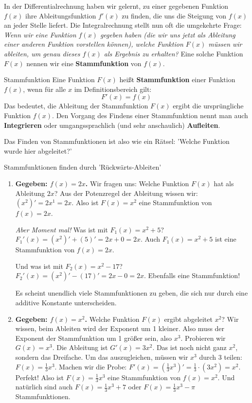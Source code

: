 In der Differentialrechnung haben wir gelernt, zu einer gegebenen Funktion $f(x)$ ihre Ableitungsfunktion $f'(x)$ zu finden, die uns die Steigung von $f(x)$ an jeder Stelle liefert.
Die Integralrechnung stellt nun oft die umgekehrte Frage:
\textit{Wenn wir eine Funktion $f(x)$ gegeben haben (die wir uns jetzt als Ableitung einer anderen Funktion vorstellen können), welche Funktion $F(x)$ müssen wir ableiten, um genau dieses $f(x)$ als Ergebnis zu erhalten?}
Eine solche Funktion $F(x)$ nennen wir eine \textbf{Stammfunktion} von $f(x)$.

\begin{merksatzumgebung}{Stammfunktion}
Eine Funktion $F(x)$ heißt \textbf{Stammfunktion} einer Funktion $f(x)$, wenn für alle $x$ im Definitionsbereich gilt:
\[ F'(x) = f(x) \]
Das bedeutet, die Ableitung der Stammfunktion $F(x)$ ergibt die ursprüngliche Funktion $f(x)$.
Den Vorgang des Findens einer Stammfunktion nennt man auch \textbf{Integrieren} oder umgangssprachlich (und sehr anschaulich) \textbf{Aufleiten}.
\end{merksatzumgebung}

Das Finden von Stammfunktionen ist also wie ein Rätsel: 'Welche Funktion wurde hier abgeleitet?'

\begin{beispielumgebung}{Stammfunktionen finden durch 'Rückwärts-Ableiten'}
\begin{enumerate}
    \item \textbf{Gegeben: $f(x) = 2x$.}
        Wir fragen uns: Welche Funktion $F(x)$ hat als Ableitung $2x$?
        Aus der Potenzregel der Ableitung wissen wir: $(x^2)' = 2x^1 = 2x$.
        Also ist $F(x) = x^2$ eine Stammfunktion von $f(x)=2x$.

        \textit{Aber Moment mal!} Was ist mit $F_1(x) = x^2 + 5$?
        $F_1'(x) = (x^2)' + (5)' = 2x + 0 = 2x$.
        Auch $F_1(x) = x^2+5$ ist eine Stammfunktion von $f(x)=2x$.

        Und was ist mit $F_2(x) = x^2 - 17$?
        $F_2'(x) = (x^2)' - (17)' = 2x - 0 = 2x$.
        Ebenfalls eine Stammfunktion!

        Es scheint unendlich viele Stammfunktionen zu geben, die sich nur durch eine additive Konstante unterscheiden.

    \item \textbf{Gegeben: $f(x) = x^2$.}
        Welche Funktion $F(x)$ ergibt abgeleitet $x^2$?
        Wir wissen, beim Ableiten wird der Exponent um 1 kleiner. Also muss der Exponent der Stammfunktion um 1 größer sein, also $x^3$.
        Probieren wir $G(x)=x^3$. Die Ableitung ist $G'(x)=3x^2$.
        Das ist noch nicht ganz $x^2$, sondern das Dreifache. Um das auszugleichen, müssen wir $x^3$ durch 3 teilen:
        $F(x) = \frac{1}{3}x^3$.
        Machen wir die Probe: $F'(x) = (\frac{1}{3}x^3)' = \frac{1}{3} \cdot (3x^2) = x^2$. Perfekt!
        Also ist $F(x) = \frac{1}{3}x^3$ eine Stammfunktion von $f(x)=x^2$.
        Und natürlich sind auch $F(x) = \frac{1}{3}x^3 + 7$ oder $F(x) = \frac{1}{3}x^3 - \pi$ Stammfunktionen.
\end{enumerate}
\end{beispielumgebung}

